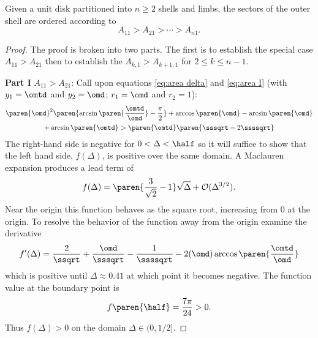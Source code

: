 \begin{myTheorem}  
Given a unit disk partitioned into $n\ge2$ shells and limbs, the sectors of the outer shell are ordered according to
  \begin{equation}
    A_{11} > A_{21} > \cdots > A_{n1}.
  \end{equation}
\label{eq:shell dom}
\end{myTheorem}  %
\begin{proof}  %
The proof is broken into two parts. The first is to establish the special case $A_{11}>A_{21}$ then to establish the $A_{k,1}>A_{k+1,1}$ for $2\le k \le n-1$.

\textbf{Part I} $A_{11} > A_{21}$:
Call upon equations \eqref{eq:area delta} and \eqref{eq:area I} (with $y_{1} = \omtd$ and $y_{2} = \omd$; $r_{1} = \omd$ and $r_{2} = 1$):
  \begin{multline}
    \paren{\omd}^{2} \paren{\arcsin\paren{\frac{\omtd}{\omd}} -  \frac{\pi}{2}} + \arccos\paren{\omd} - \arcsin \paren{\omd} \\ +\arcsin \paren{\omtd} >
    \paren{\omtd} \paren{\sssqrt - 2 \ssssqrt}
  \end{multline}
The right-hand side is negative for $0<\Delta<\half$ so it will suffice to show that the left hand side, $f(\Delta)$, is positive over the same domain. A Maclauren expansion produces a lead term of 
  \begin{equation}
    f(\Delta) = \paren{\frac{3}{\sqrt{2}} - 1} \sqrt{\Delta} + \mathcal{O}(\Delta^{3/2}) .
  \end{equation}
Near the origin this function behaves as the square root, increasing from 0 at the origin. To resolve the behavior of the function away from the origin examine the derivative
  \begin{equation}
    f'(\Delta) = \frac{2}{\ssqrt} + \frac{\omd}{\sssqrt} - \frac{1}{\ssssqrt} - 2 (\omd ) \arccos \paren{\frac{\omtd}{\omd}}
  \end{equation}
which is positive until $\Delta \approx 0.41$ at which point it becomes negative. The function value at the boundary point is
  \begin{equation}
    f \paren{\half} =\frac{7\pi}{24} > 0.
  \end{equation}
Thus $f(\Delta)> 0$ on the domain $\Delta \in (0,1/2]$.


\end{proof}
